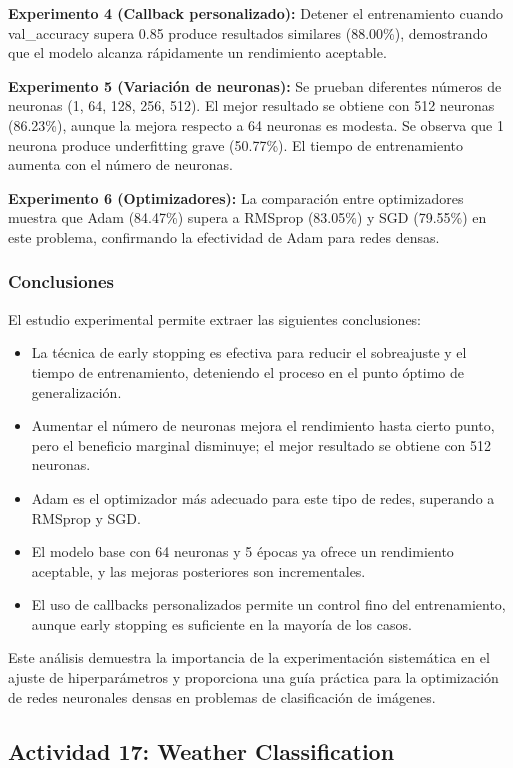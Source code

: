 \documentclass[12pt]{article}
\begin{document}
\textbf{Experimento 4 (Callback personalizado):} Detener el entrenamiento cuando val\_accuracy supera 0.85 produce resultados similares (88.00\%), demostrando que el modelo alcanza rápidamente un rendimiento aceptable.

\textbf{Experimento 5 (Variación de neuronas):} Se prueban diferentes números de neuronas (1, 64, 128, 256, 512). El mejor resultado se obtiene con 512 neuronas (86.23\%), aunque la mejora respecto a 64 neuronas es modesta. Se observa que 1 neurona produce underfitting grave (50.77\%). El tiempo de entrenamiento aumenta con el número de neuronas.

\textbf{Experimento 6 (Optimizadores):} La comparación entre optimizadores muestra que Adam (84.47\%) supera a RMSprop (83.05\%) y SGD (79.55\%) en este problema, confirmando la efectividad de Adam para redes densas.

\subsubsection*{Conclusiones}

El estudio experimental permite extraer las siguientes conclusiones:

\begin{itemize}
    \item La técnica de early stopping es efectiva para reducir el sobreajuste y el tiempo de entrenamiento, deteniendo el proceso en el punto óptimo de generalización.
    \item Aumentar el número de neuronas mejora el rendimiento hasta cierto punto, pero el beneficio marginal disminuye; el mejor resultado se obtiene con 512 neuronas.
    \item Adam es el optimizador más adecuado para este tipo de redes, superando a RMSprop y SGD.
    \item El modelo base con 64 neuronas y 5 épocas ya ofrece un rendimiento aceptable, y las mejoras posteriores son incrementales.
    \item El uso de callbacks personalizados permite un control fino del entrenamiento, aunque early stopping es suficiente en la mayoría de los casos.
\end{itemize}

Este análisis demuestra la importancia de la experimentación sistemática en el ajuste de hiperparámetros y proporciona una guía práctica para la optimización de redes neuronales densas en problemas de clasificación de imágenes.

\subsection{Actividad 17: Weather Classification}
\end{document}
